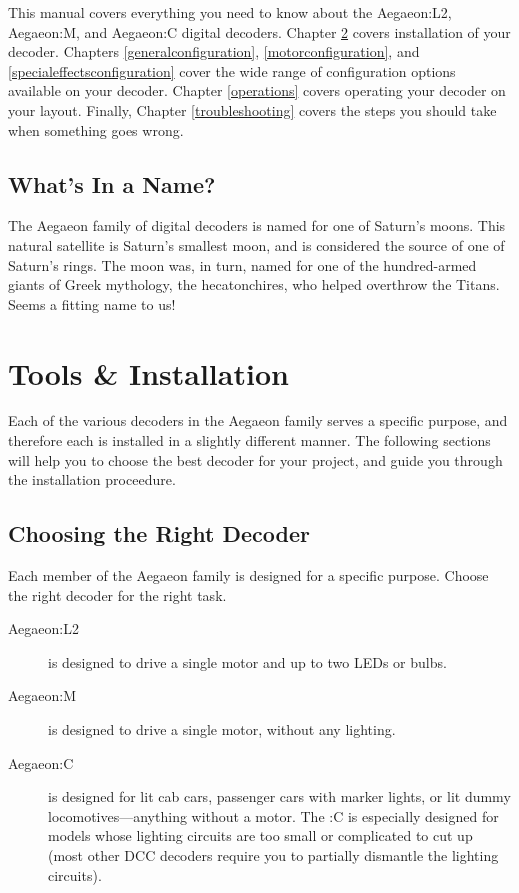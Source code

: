 \documentclass[12pt,letterpaper,draft]{memoir} %
\begin{document}
This manual covers everything you need to know about the Aegaeon:L2, Aegaeon:M, and Aegaeon:C digital decoders. Chapter \ref{installation} covers installation of your decoder. Chapters \ref{generalconfiguration}, \ref{motorconfiguration}, and \ref{specialeffectsconfiguration} cover the wide range of configuration options available on your decoder. Chapter \ref{operations} covers operating your decoder on your layout. Finally, Chapter \ref{troubleshooting} covers the steps you should take when something goes wrong.

\section{What's In a Name?}

The Aegaeon family of digital decoders is named for one of Saturn's moons. This natural satellite is Saturn's smallest moon, and is considered the source of one of Saturn's rings. The moon was, in turn, named for one of the hundred-armed giants of Greek mythology, the hecatonchires, who helped overthrow the Titans. Seems a fitting name to us!

\chapter{Tools \& Installation}
\label{installation}
Each of the various decoders in the Aegaeon family serves a specific purpose, and therefore each is installed in a slightly different manner. The following sections will help you to choose the best decoder for your project, and guide you through the installation proceedure.

\section{Choosing the Right Decoder}

Each member of the Aegaeon family is designed for a specific purpose. Choose the right decoder for the right task.

\begin{description}
\item[Aegaeon:L2] is designed to drive a single motor and up to two LEDs or bulbs.
\item[Aegaeon:M] is designed to drive a single motor, without any lighting.
\item[Aegaeon:C] is designed for lit cab cars, passenger cars with marker lights, or lit dummy locomotives---anything without a motor. The :C is especially designed for models whose lighting circuits are too small or complicated to cut up (most other DCC decoders require you to partially dismantle the lighting circuits).
\end{description}
\end{document}

